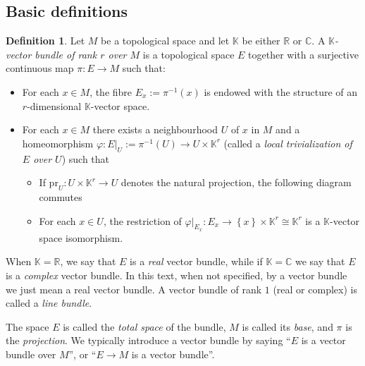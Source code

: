 \documentclass[11pt,a4paper]{book}
\theoremstyle{remark} \newtheorem{rmk}[thm]{Remark}
\theoremstyle{definition} \newtheorem{defn}[thm]{Definition}
\theoremstyle{definition} \newtheorem{ex}[thm]{Example}
\theoremstyle{definition} \newtheorem{ej}[thm]{Exercise}
\begin{document}
\subsection{Basic definitions}
\begin{defn}
  Let $M$ be a topological space and let $\mathbb{K}$ be either $\mathbb{R}$ or $\mathbb{C}$. A \emph{$\mathbb{K}$-vector bundle of rank $r$ over $M$} is a topological space $E$ together with a surjective continuous map $\pi:E\rightarrow M$ such that:
  \begin{itemize}
    \item For each $x\in M$, the fibre $E_x:=\pi^{-1}(x)$ is endowed with the structure of an $r$-dimensional $\mathbb{K}$-vector space.
    \item For each $x\in M$ there exists a neighbourhood $U$ of $x$ in $M$ and a homeomorphism $\varphi: E|_U:= \pi^{-1}(U)\rightarrow U \times \mathbb{K}^r$ (called a \emph{local trivialization of $E$ over $U$}) such that
          \begin{itemize}
            \item If $\mathrm{pr}_U: U \times \mathbb{K}^r \rightarrow U$ denotes the natural projection, the following diagram commutes
                  \begin{center}
                  \end{center}
            \item For each $x\in U$, the restriction of $\varphi|_{E_x}: E_x \rightarrow \left\{ x \right\}\times \mathbb{K}^r \cong \mathbb{K}^r$ is a $\mathbb{K}$-vector space isomorphism.
          \end{itemize}
  \end{itemize}
  When $\mathbb{K}=\mathbb{R}$, we say that $E$ is a \emph{real} vector bundle, while if $\mathbb{K}=\mathbb{C}$ we say that $E$ is a \emph{complex} vector bundle. In this text, when not specified, by a vector bundle we just mean a real vector bundle. A vector bundle of rank $1$ (real or complex) is called a \emph{line bundle}.

  The space $E$ is called the \emph{total space} of the bundle, $M$ is called its \emph{base}, and $\pi$ is the \emph{projection}. We typically introduce a vector bundle by saying ``$E$ is a vector bundle over $M$'', or ``$E\rightarrow M$ is a vector bundle''.


\end{defn}
\end{document}
